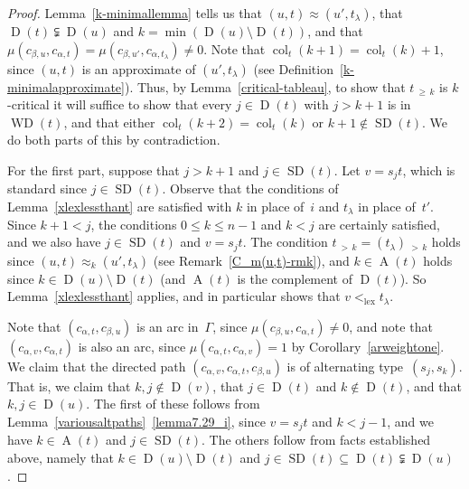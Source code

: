 \documentclass[10pt]{amsart}
\theoremstyle{definition}
\DeclareMathOperator{\lex}{lex}
\DeclareMathOperator{\col}{col}
\newcommand{\morethan}[2]{#1\,{_{>\,#2}}}
\newcommand{\Morethan}[2]{#1\,{_{\geqslant\,#2}}}
\DeclareMathOperator{\SD}{SD}
\DeclareMathOperator{\WD}{WD}
\DeclareMathOperator{\D}{D}
\DeclareMathOperator{\A}{A}
\begin{document}
\begin{proof}
Lemma~\ref{k-minimallemma} tells us that $(u,t)\approx (u',t_\lambda)$, that
$\D(t)\subsetneqq\D(u)$ and $k=\min(\D(u)\setminus\D(t))$,
and that $\mu(c_{\beta,u},c_{\alpha,t})=\mu(c_{\beta,u'},c_{\alpha,t_\lambda})\neq 0$.
Note that $\col_t(k+1)=\col_t(k)+1$, since $(u,t)$ is an approximate of
$(u',t_\lambda)$ (see Definition~\ref{k-minimalapproximate}). Thus, by Lemma~\ref{critical-tableau},
to show that $\Morethan tk$
is $k$-critical it will suffice to show that every $j\in\D(t)$ with
$j>k+1$ is in $\WD(t)$, and that either $\col_t(k+2)=\col_t(k)$
or $k+1\notin\SD(t)$. We do both parts of this by contradiction.

For the first part, suppose that $j>k+1$ and $j\in\SD(t)$. Let $v=s_jt$,
which is standard since $j\in\SD(t)$. Observe that the conditions of
Lemma~\ref{xlexlessthant} are satisfied with $k$ in place of~$i$
and $t_\lambda$ in place of~$t'$. Since $k+1<j$, the conditions
$0\leqslant k\leqslant n-1$ and $k<j$ are certainly satisfied, and
we also have $j\in\SD(t)$ and $v=s_jt$. The condition
$\morethan {\morethan tk=(t_\lambda)}k$ holds since $(u,t)\approx_k(u',t_\lambda)$
(see Remark~\ref{C_m(u,t)-rmk}), and $k\in\A(t)$ holds since
$k\in\D(u)\setminus\D(t)$ (and $\A(t)$ is the complement of $\D(t)$).
So Lemma~\ref{xlexlessthant} applies, and in particular shows
that $v<_{\lex}t_\lambda$.

Note that $(c_{\alpha,t},c_{\beta,u})$ is an arc in~$\Gamma$, since
$\mu(c_{\beta,u},c_{\alpha,t})\neq 0$, and note that $(c_{\alpha,v},c_{\alpha,t})$
is also an arc, since $\mu(c_{\alpha,t},c_{\alpha,v})=1$ by Corollary~\ref{arweightone}.
We claim that the directed path $(c_{\alpha,v},c_{\alpha,t},c_{\beta,u})$
is of alternating type~$(s_j,s_k)$. That is, we claim that $k,j\notin\D(v)$,
that $j\in\D(t)$ and $k\notin\D(t)$, and that $k,j\in\D(u)$.
The first of these follows from Lemma~\ref{variousaltpaths}~\ref{lemma7.29_i}, since
$v=s_jt$ and $k<j-1$, and we have $k\in\A(t)$ and $j\in\SD(t)$.
The others follow from facts established above, namely that $k\in\D(u)\setminus\D(t)$
and $j\in\SD(t)\subseteq\D(t)\subsetneqq\D(u)$.


\end{proof}
\end{document}
